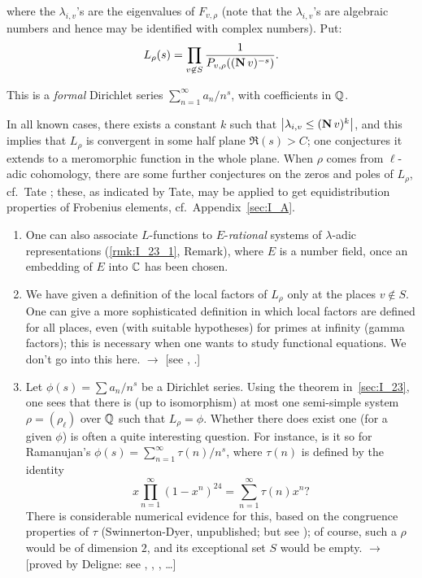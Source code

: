 where the $\lambda_{i,v}$'s are the eigenvalues of $F_{v,\rho}$ (note that the 
$\lambda_{i,v}$'s are algebraic numbers and hence may be identified with 
complex numbers). Put:
\[
L_\rho(s) = \prod_{v \not\in S} \frac{1}{P_{v,\rho}((\operatorname{\mathbf{N}} v)^{-s})}.
\]

This is a \emph{formal} Dirichlet series $\sum_{n=1}^{\infty} a_n / n^s$, with 
coefficients in $\mathbb{Q}$.

In all known cases, there exists a constant $k$ such that $\left|{\lambda_{i,v} 
\leq (\operatorname{\mathbf{N}} v)^k}\right|$, and this implies that $L_\rho$ is convergent in 
some half plane $\Re(s) > C$; one conjectures it extends to a meromorphic 
function in the whole plane.
\dpage
When $\rho$ comes from $\ell$-adic cohomology, 
there are some further conjectures on the zeros and poles of $L_\rho$, cf.\ Tate 
\cite{36}; these, as indicated by Tate, may be applied to get equidistribution 
properties of Frobenius elements, cf.\ Appendix~\ref{sec:I_A}.

\begin{obs}
\begin{enumerate}
\item\label{rmk:I_24_1}
	One can also associate $L$-functions to $E$-\emph{rational} systems of
	$\lambda$-adic representations (\ref{rmk:I_23_1}, Remark), where $E$ is
	a number field, once an embedding of $E$ into $\mathbb{C}$ has been chosen.
\item We have given a definition of the local factors of $L_\rho$ only at 
	the places $v \not\in S$. One can give a more sophisticated definition in 
	which local factors are defined for all places, even (with suitable 
	hypotheses) for primes at infinity (gamma factors); this is necessary when 
	one wants to study functional equations. We don't go into this here. 
	$\rightarrow$ [see \cite{51}, \cite{74}.]
	
	\item Let $\phi(s) = \sum a_n / n^s $ be a Dirichlet series. Using the 
	theorem in~\ref{sec:I_23}, one sees that there is (up to isomorphism) at 
	most one semi-simple system $\rho = (\rho_\ell)$ over $\mathbb{Q}$ such that 
	$L_\rho = \phi$.
	Whether there does exist one (for a given $\phi$) is often a quite
	interesting question.
	For instance, is it so for Ramanujan's $\phi(s) = \sum_{n=1}^{\infty}
	\tau(n)/n^s$, where $\tau(n)$ is defined by the identity
	\[
		x \prod_{n=1}^{\infty}(1 - x^n)^{24} =
		\sum_{n=1}^{\infty}\tau(n)x^n?
	\]
	There is considerable numerical evidence for this, based on the
	congruence properties of $\tau$ (Swinnerton-Dyer, unpublished; but see
	\cite{81}); of course,
	such a $\rho$ would be of dimension $2$, and its exceptional set $S$
	would be empty. $\rightarrow$
	[proved by Deligne: see \cite{49}, \cite{50}, \cite{65}, \dots]
\end{enumerate}
\end{obs}

